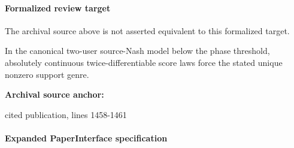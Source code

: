 \documentclass[10pt]{article}
\begin{document}
\paragraph{Formalized review target}
The archival source above is not asserted equivalent to this formalized target.
\begin{ReviewVerbatim}
In the canonical two-user source-Nash model below the phase threshold, absolutely continuous twice-differentiable score laws force the stated unique nonzero support genre.
\end{ReviewVerbatim}

\textbf{Archival source anchor:} {\footnotesize\raggedright cited publication, lines 1458-\allowbreak{}1461\par}
\paragraph{Expanded PaperInterface specification}
\end{document}

